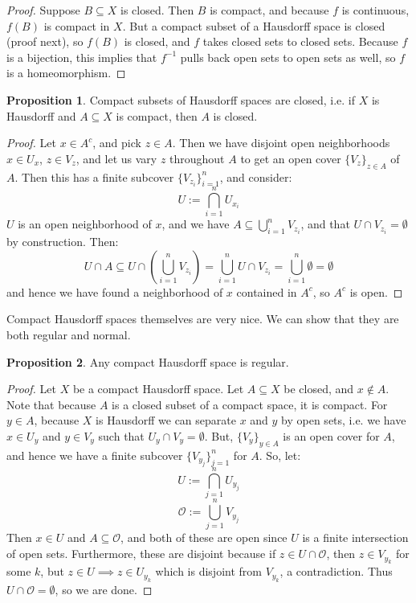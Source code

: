 \documentclass[11pt, oneside]{amsart}   	%
\theoremstyle{definition}
\newtheorem{prop}{Proposition}[section]
\begin{document}
	\begin{proof}
		Suppose $B\subseteq X$ is closed. Then $B$ is compact, and because $f$ is continuous, $f(B)$ is compact in $X$. 
		But a compact subset of a Hausdorff space is closed (proof next), so $f(B)$ is closed, and $f$ takes closed sets to 
		closed sets. Because $f$ is a bijection, this implies that $f^{-1}$ pulls back open sets to open sets as well, so $f$ is 
		a homeomorphism. 
	\end{proof}
	
	\begin{prop}
		Compact subsets of Hausdorff spaces are closed, i.e. if $X$ is Hausdorff and $A\subseteq X$ is compact, then $A$ 
		is closed. 
	\end{prop}
	
	\begin{proof}
		Let $x\in A^c$, and pick $z\in A$. Then we have disjoint open neighborhoods $x\in U_x$, $z\in V_z$, and let us vary 
		$z$ throughout $A$ to get an open cover $\{V_z\}_{z\in A}$ of $A$. Then this has a finite subcover 
		$\{V_{z_i}\}_{i = 1}^n$, and consider:
		$$
			U := \bigcap_{i = 1}^n U_{x_i}
		$$
		$U$ is an open neighborhood of $x$, and we have $A\subseteq \bigcup_{i = 1}^n V_{z_i}$, and that $U\cap V_{z_i} 
		= \emptyset$ by construction. Then:
		$$
			U\cap A \subseteq U\cap(\bigcup_{i = 1}^n V_{z_i}) = \bigcup_{i = 1}^n U\cap V_{z_i} = \bigcup_{i = 1}^n
			\emptyset = \emptyset
		$$
		and hence we have found a neighborhood of $x$ contained in $A^c$, so $A^c$ is open.
	\end{proof}
	
	Compact Hausdorff spaces themselves are very nice. We can show that they are both regular and normal.
	
	\begin{prop}
		Any compact Hausdorff space is regular.
	\end{prop}
	
	\begin{proof}
		Let $X$ be a compact Hausdorff space. Let $A\subseteq X$ be closed, and $x\notin A$. Note that because $A$ 
		is a closed subset of a compact space, it is compact. For $y\in A$, because $X$ is Hausdorff we can separate $x$ 
		and $y$ by open sets, i.e. we have $x\in U_y$ and $y\in V_y$ such that $U_y\cap V_y = \emptyset$. But, 
		$\{V_y\}_{y\in A}$ is an open cover for $A$, and hence we have a finite subcover $\{V_{y_j}\}_{j = 1}^n$ for $A$. 
		So, let:
		$$
			U := \bigcap_{j = 1}^n U_{y_j}
		$$
		$$
			\mathcal O := \bigcup_{j = 1}^n V_{y_j}
		$$
		Then $x\in U$ and $A\subseteq \mathcal O$, and both of these are open since $U$ is a finite intersection of 
		open sets. Furthermore, these are disjoint because if $z\in U\cap\mathcal O$, then $z\in V_{y_k}$ for some 
		$k$, but $z\in U\implies z\in U_{y_k}$ which is disjoint from $V_{y_k}$, a contradiction. Thus $U\cap
		\mathcal O = \emptyset$, so we are done.
	\end{proof}
	
\end{document}

